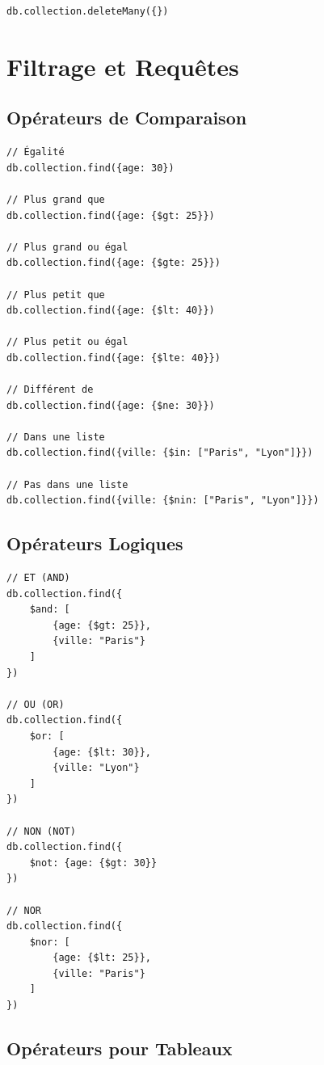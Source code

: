 \documentclass[11pt,a4paper]{article}
\begin{document}
\begin{lstlisting}
db.collection.deleteMany({})
\end{lstlisting}

\newpage

\section{Filtrage et Requêtes}

\subsection{Opérateurs de Comparaison}

\begin{lstlisting}
// Égalité
db.collection.find({age: 30})

// Plus grand que
db.collection.find({age: {$gt: 25}})

// Plus grand ou égal
db.collection.find({age: {$gte: 25}})

// Plus petit que
db.collection.find({age: {$lt: 40}})

// Plus petit ou égal
db.collection.find({age: {$lte: 40}})

// Différent de
db.collection.find({age: {$ne: 30}})

// Dans une liste
db.collection.find({ville: {$in: ["Paris", "Lyon"]}})

// Pas dans une liste
db.collection.find({ville: {$nin: ["Paris", "Lyon"]}})
\end{lstlisting}

\subsection{Opérateurs Logiques}

\begin{lstlisting}
// ET (AND)
db.collection.find({
    $and: [
        {age: {$gt: 25}},
        {ville: "Paris"}
    ]
})

// OU (OR)
db.collection.find({
    $or: [
        {age: {$lt: 30}},
        {ville: "Lyon"}
    ]
})

// NON (NOT)
db.collection.find({
    $not: {age: {$gt: 30}}
})

// NOR
db.collection.find({
    $nor: [
        {age: {$lt: 25}},
        {ville: "Paris"}
    ]
})
\end{lstlisting}

\subsection{Opérateurs pour Tableaux}
\end{document}
